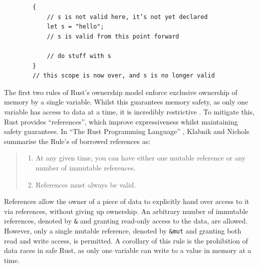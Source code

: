 \begin{code}
    \begin{verbatim}
        {
            // s is not valid here, it’s not yet declared
            let s = "hello";
            // s is valid from this point forward

            // do stuff with s
        }
        // this scope is now over, and s is no longer valid
    \end{verbatim}
    \caption{A Rust program to demonstrate the scope of variables, derived from Listing 4-1 of Klabnik and Nichols' ``The Rust Programming Language'' \cite{RustProgrammingLanguage}.}
    \label{listing:rust-scope}
\end{code}

The first two rules of Rust's ownership model enforce exclusive ownership of memory by a single variable. Whilst this guarantees memory safety, as only one variable has access to data at a time, it is incredibly restrictive \cite{sautterOBSERVINGPARALLELEXECUTION}. To mitigate this, Rust provides ``references'', which improve expressiveness whilst maintaining safety guarantees. In ``The Rust Programming Language'' \cite{RustProgrammingLanguage}, Klabnik and Nichols summarise the Rule's of borrowed references as:

\begin{quote}
    \begin{enumerate}
        \item At any given time, you can have either one mutable reference or any number of immutable references.
        \item References must always be valid.
    \end{enumerate}
\end{quote}

References allow the owner of a piece of data to explicitly hand over access to it via references, without giving up ownership. An arbitrary number of immutable references, denoted by \texttt{&} and granting read-only access to the data, are allowed. However, only a single mutable reference, denoted by \texttt{&mut} and granting both read and write access, is permitted. A corollary of this rule is the prohibition of data races in safe Rust, as only one variable can write to a value in memory at a time.


